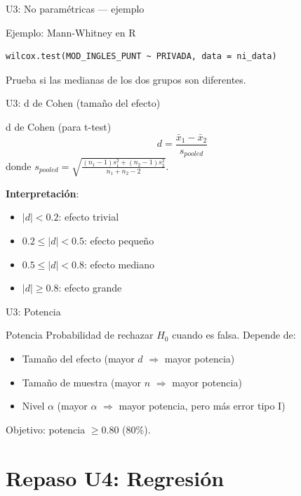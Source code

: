 \documentclass[aspectratio=169, 11pt]{beamer}
\begin{document}
\begin{frame}[fragile]{U3: No paramétricas --- ejemplo}
\begin{exampleblock}{Ejemplo: Mann-Whitney en R}
\begin{lstlisting}
wilcox.test(MOD_INGLES_PUNT ~ PRIVADA, data = ni_data)
\end{lstlisting}
Prueba si las medianas de los dos grupos son diferentes.
\end{exampleblock}
\end{frame}

\begin{frame}{U3: d de Cohen (tamaño del efecto)}
\begin{block}{d de Cohen (para t-test)}
$$d = \frac{\bar{x}_1 - \bar{x}_2}{s_{pooled}}$$
donde $s_{pooled} = \sqrt{\frac{(n_1-1)s_1^2 + (n_2-1)s_2^2}{n_1 + n_2 - 2}}$.

\textbf{Interpretación}:
\begin{itemize}
\item $|d| < 0.2$: efecto trivial
\item $0.2 \leq |d| < 0.5$: efecto pequeño
\item $0.5 \leq |d| < 0.8$: efecto mediano
\item $|d| \geq 0.8$: efecto grande
\end{itemize}
\end{block}
\end{frame}

\begin{frame}{U3: Potencia}
\begin{alertblock}{Potencia}
Probabilidad de rechazar $H_0$ cuando es falsa. Depende de:
\begin{itemize}
\item Tamaño del efecto (mayor $d$ $\Rightarrow$ mayor potencia)
\item Tamaño de muestra (mayor $n$ $\Rightarrow$ mayor potencia)
\item Nivel $\alpha$ (mayor $\alpha$ $\Rightarrow$ mayor potencia, pero más error tipo I)
\end{itemize}
Objetivo: potencia $\geq 0.80$ (80\%).
\end{alertblock}
\end{frame}

\section{Repaso U4: Regresión}
\end{document}
